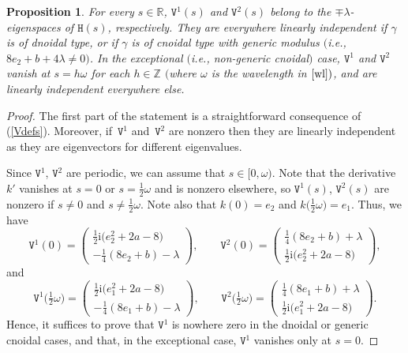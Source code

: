 \documentclass[pdftex]{sigma}
\newcommand\kk{k} %
\def\ri{\mathrm{i}}
\def\gam{\gamma} %
\def\R{\mathbb R}
\def\Z{\mathbb Z}
\newcommand\tV{\mathtt{V}}
\numberwithin{equation}{section}
\newtheorem{Proposition}[Theorem]{Proposition}
 { \theoremstyle{definition}
\newtheorem{Definition}[Theorem]{Definition}
\newtheorem{Note}[Theorem]{Note}
\newtheorem{Example}[Theorem]{Example}
\newtheorem{Remark}[Theorem]{Remark} }
\begin{document}
\begin{Proposition}\label{exceptional} For every $s \in \R$, ${\mathtt V}^1(s)$ and ${\mathtt V}^2(s)$ belong to the $\mp\lambda$-eigenspaces of ${\mathtt H}(s)$, respectively. They are everywhere linearly independent if $\gam$ is of dnoidal type, or if $\gam$ is of cnoidal type with {\it generic modulus} $($i.e., $8e_2+b+4\lambda\neq 0)$. In the exceptional $($i.e., non-generic cnoidal$)$ case, ${\mathtt V}^1$ and ${\mathtt V}^2$ vanish at $s=h\omega$ for each $h\in \Z$ $($where $\omega$ is the wavelength in $\eqref{wl})$, and are linearly independent everywhere else.

 \end{Proposition}


 \begin{proof}
 The first part of the statement is a straightforward consequence of (\ref{Vdefs}).
Moreover, if~${\mathtt V}^1$ and~${\mathtt V}^2$ are nonzero then they are
linearly independent as they are eigenvectors for different eigenvalues.

Since $\tV^1$, $\tV^2$ are periodic, we can assume that $s\in [0, \omega)$.
Note that the derivative $\kk'$ vanishes at $s=0$ or $s=\tfrac12 \omega$ and is nonzero elsewhere, so
$\tV^1(s)$, $\tV^2(s)$ are nonzero if $s\ne 0$ and $s\ne \tfrac12 \omega$.
Note also that $\kk(0) = e_2$ and $\kk\bigl(\tfrac12\omega\bigr) = e_1$.
Thus, we have
\[\renewcommand{\arraystretch}{1.1}
 \tV^1(0)=\begin{pmatrix} \tfrac12 {\ri}\bigl(e_2^2+2a-8\bigr) \\ -\frac{1}{4}(8e_2+b)-\lambda\end{pmatrix}, \qquad
 \tV^2(0)=\begin{pmatrix} \frac{1}{4}(8e_2+b)+\lambda \\ \tfrac12 {\ri}\bigl(e_2^2+2a-8\bigr)\end{pmatrix},
\]
and
\[\renewcommand{\arraystretch}{1.1}
\tV^1\bigl(\tfrac12\omega\bigr)=\begin{pmatrix}\tfrac12 \ri \bigl(e_1^2+2a-8\bigr)\\ -\frac{1}{4}(8e_1+b)-\lambda\end{pmatrix},\qquad
\tV^2\bigl(\tfrac12\omega\bigr)=\begin{pmatrix} \frac{1}{4}(8e_1+b)+\lambda\\ \tfrac12 {\ri}\bigl(e_1^2+2a-8\bigr)\end{pmatrix}.
\]
Hence, it suffices to prove that
${\mathtt V}^1$ is nowhere zero in the dnoidal or generic cnoidal cases, and that, in the exceptional case, ${\mathtt V}^1$ vanishes only at $s=0$.


\end{proof}
\end{document}
